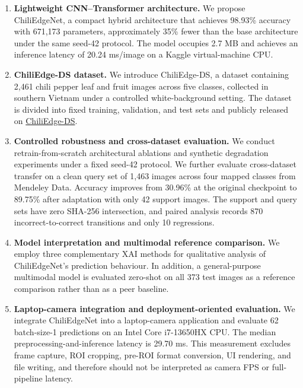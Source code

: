 \begin{enumerate}
\item \textbf{Lightweight CNN--Transformer architecture.} We propose ChiliEdgeNet, a compact hybrid architecture that achieves 98.93\% accuracy with 671,173 parameters, approximately 35\% fewer than the base architecture under the same seed-42 protocol. The model occupies 2.7 MB and achieves an inference latency of 20.24 ms/image on a Kaggle virtual-machine CPU.

\item \textbf{ChiliEdge-DS dataset.} We introduce ChiliEdge-DS, a dataset containing 2,461 chili pepper leaf and fruit images across five classes, collected in southern Vietnam under a controlled white-background setting. The dataset is divided into fixed training, validation, and test sets and publicly released on \href{https://drive.google.com/drive/folders/1DesS0c5xT6J72tIv8AMZLwC8ANFUk2PC?usp=drive_link}{ChiliEdge-DS}.

\item \textbf{Controlled robustness and cross-dataset evaluation.} We conduct retrain-from-scratch architectural ablations and synthetic degradation experiments under a fixed seed-42 protocol. We further evaluate cross-dataset transfer on a clean query set of 1,463 images across four mapped classes from Mendeley Data. Accuracy improves from 30.96\% at the original checkpoint to 89.75\% after adaptation with only 42 support images. The support and query sets have zero SHA-256 intersection, and paired analysis records 870 incorrect-to-correct transitions and only 10 regressions.

\item \textbf{Model interpretation and multimodal reference comparison.} We employ three complementary XAI methods for qualitative analysis of ChiliEdgeNet's prediction behaviour. In addition, a general-purpose multimodal model is evaluated zero-shot on all 373 test images as a reference comparison rather than as a peer baseline.

\item \textbf{Laptop-camera integration and deployment-oriented evaluation.} We integrate ChiliEdgeNet into a laptop-camera application and evaluate 62 batch-size-1 predictions on an Intel Core i7-13650HX CPU. The median preprocessing-and-inference latency is 29.70 ms. This measurement excludes frame capture, ROI cropping, pre-ROI format conversion, UI rendering, and file writing, and therefore should not be interpreted as camera FPS or full-pipeline latency.

\end{enumerate}


